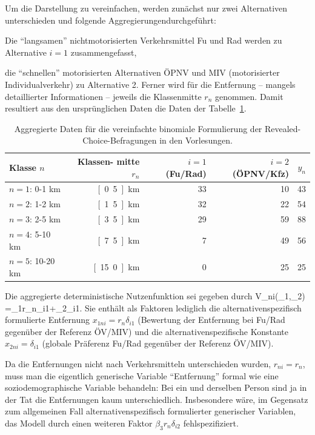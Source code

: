 Um die Darstellung zu vereinfachen,  werden zun\"achst nur zwei Alternativen
unterschieden und folgende Aggregierungendurchgef\"uhrt:
\bi
\item Die ``langsamen'' nichtmotorisierten Verkehrsmittel Fu\3 und Rad werden zu
Alternative $i=1$ zusammengefasst,
\item die ``schnellen'' motorisierten Alternativen \"OPNV und MIV (motorisierter
Individualverkehr) zu Alternative 2.
\ei
Ferner wird f\"ur die Entfernung  -- mangels
detaillierter Informationen -- jeweils die Klassenmitte $r_n$ genommen.
Damit resultiert aus den urspr\"unglichen Daten  die Daten der
Tabelle~\ref{tab:revealedChoiceBin}.
%
\begin{table}
\begin{center}
\begin{tabular}{|l||r|r|r||r|} \hline
Klasse $n$ & \myBox{4em}{Klassen-\\mitte $r_n$} &
$i=1$ (Fu\3/Rad) & $i=2$ (\"OPNV/Kfz)  & $y_n$ \\
\hline\hline
$n=1$: 0-1 km  & \unit[0.5]{km} & 33 & 10 & 43 \\
$n=2$: 1-2 km  & \unit[1.5]{km} & 32 & 22 & 54 \\
$n=3$: 2-5 km  & \unit[3.5]{km} & 29 & 59 & 88\\
$n=4$: 5-10 km  & \unit[7.5]{km} & 7 & 49 & 56\\
$n=5$: 10-20 km  & \unit[15.0]{km} & 0 & 25 & 25 \\ \hline
\end{tabular}
\end{center}
\caption{\label{tab:revealedChoiceBin}Aggregierte Daten f\"ur die vereinfachte
  binomiale Formulierung der Revealed-Choice-Befragungen in
  den Vorlesungen.}
\end{table}
%
Die aggregierte deterministische Nutzenfunktion sei
gegeben durch
\be
\label{VdetRevealedChoiceBin}
V_{ni}(\beta_1,\beta_2) =\beta_1r_n\delta_{i1}+\beta_2\delta_{i1}.
\ee
Sie enth\"alt als Faktoren lediglich die alternativenspezifisch
formulierte Entfernung $x_{1ni}=r_n\delta_{i1}$ (Bewertung der
Entfernung bei Fu\3/Rad gegen\"uber der Referenz \"OV/MIV) 
und die alternativenspezifische Konstante $x_{2ni}=\delta_{i1}$ (globale
Pr\"aferenz Fu\3/Rad gegen\"uber der Referenz \"OV/MIV).

Da die
Entfernungen nicht nach Verkehrsmitteln unterschieden wurden, $r_{ni}=r_n$,
muss man die eigentlich generische Variable
``Entfernung'' formal wie eine soziodemographische Variable
behandeln: Bei ein und derselben Person sind ja in der Tat die
Entfernungen kaum unterschiedlich.
Insbesondere w\"are, im Gegensatz zum allgemeinen
Fall alternativenspezifisch formulierter generischer Variablen, 
das Modell durch einen weiteren Faktor $\beta_3r_n\delta_{i2}$ fehlspezifiziert.


